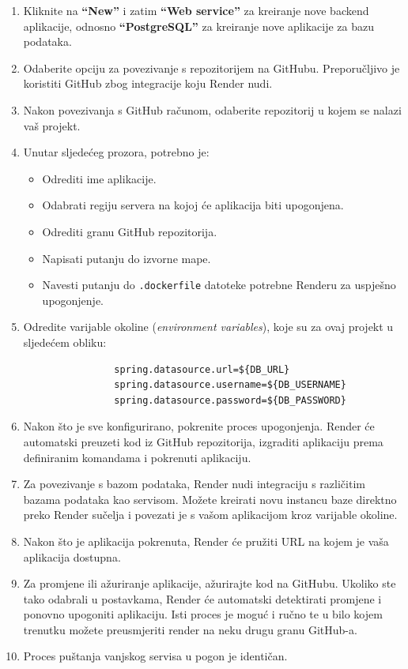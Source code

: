 		\begin{enumerate}
			\item Kliknite na \textbf{``New''} i zatim \textbf{``Web service''} za kreiranje nove backend aplikacije, odnosno \textbf{``PostgreSQL''} za kreiranje nove aplikacije za bazu podataka.
			
			\item Odaberite opciju za povezivanje s repozitorijem na GitHubu. Preporučljivo je koristiti GitHub zbog integracije koju Render nudi. 
			
			\item Nakon povezivanja s GitHub računom, odaberite repozitorij u kojem se nalazi vaš projekt.
			
			\item Unutar sljedećeg prozora, potrebno je:
			\begin{itemize}
				\item Odrediti ime aplikacije.
				\item Odabrati regiju servera na kojoj će aplikacija biti upogonjena.
				\item Odrediti granu GitHub repozitorija.
				\item Napisati putanju do izvorne mape.
				\item Navesti putanju do \texttt{.dockerfile} datoteke potrebne Renderu za uspješno upogonjenje.
			\end{itemize}
			
			\item Odredite varijable okoline (\textit{environment variables}), koje su za ovaj projekt u sljedećem obliku:
			\begin{verbatim}
				spring.datasource.url=${DB_URL}
				spring.datasource.username=${DB_USERNAME}
				spring.datasource.password=${DB_PASSWORD}
			\end{verbatim}
			
			\item Nakon što je sve konfigurirano, pokrenite proces upogonjenja. Render će automatski preuzeti kod iz GitHub repozitorija, izgraditi aplikaciju prema definiranim komandama i pokrenuti aplikaciju.
			
			\item Za povezivanje s bazom podataka, Render nudi integraciju s različitim bazama podataka kao servisom. Možete kreirati novu instancu baze direktno preko Render sučelja i povezati je s vašom aplikacijom kroz varijable okoline.
			
			\item Nakon što je aplikacija pokrenuta, Render će pružiti URL na kojem je vaša aplikacija dostupna.
			
			\item Za promjene ili ažuriranje aplikacije, ažurirajte kod na GitHubu. Ukoliko ste tako odabrali u postavkama, Render će automatski detektirati promjene i ponovno upogoniti aplikaciju. Isti proces je moguć i ručno te u bilo kojem trenutku možete preusmjeriti render na neku drugu granu GitHub-a.
			
			\item Proces puštanja vanjskog servisa u pogon je identičan.
		\end{enumerate}
	
